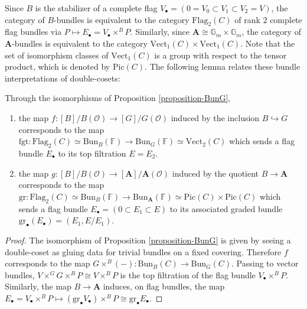 Since $B$ is the stabilizer of a complete flag $V_\bullet = (0=V_0\subset V_1\subset V_2=V)$, the category of $B$-bundles is equivalent to the category $\mathrm{Flag}_2(C)$ of rank $2$ complete flag bundles via $P\mapsto E_\bullet = V_\bullet \times^B P$. Similarly, since $\mathbf A\cong \mathbb G_m\times\mathbb G_m$, the category of $\mathbf A$-bundles is equivalent to the category $\mathrm{Vect}_1 (C)\times \mathrm{Vect}_1 (C)$. Note that the set of isomorphism classes of $\mathrm{Vect}_1 (C)$ is a group with respect to the tensor product, which is denoted by $\mathrm{Pic}(C)$. The following lemma relates these bundle interpretations of double-cosets:
\begin{lemma}
\label{lemma-flag-graded}
Through the isomorphisms of Proposition \ref{proposition-BunG},
\begin{enumerate}
\item the map $f: [B] /B(\mathcal O)\to [G]/G(\mathcal O)$ induced by the inclusion $B\hookrightarrow G$ corresponds to the map $\mathrm{fgt}: \mathrm{Flag}_2(C) \simeq\mathrm{Bun}_B(\mathbb F) \to \mathrm{Bun}_G(\mathbb F)\simeq \mathrm{Vect}_2(C)$ which sends a flag bundle $E_\bullet$ to its top filtration $E=E_2$.
\item the map $g: [B]/B(\mathcal O)\to [\mathbf A]/\mathbf A(\mathcal O)$ induced by the quotient $B\to \mathbf A$ corresponds to the map $\mathrm{gr}: \mathrm{Flag}_2(C)\simeq \mathrm{Bun}_B(\mathbb F)\to \mathrm{Bun}_{\mathbf A}(\mathbb F)\simeq \mathrm{Pic}(C)\times \mathrm{Pic}(C)$ which sends a flag bundle $E_\bullet = (0\subset E_1\subset E)$ to its associated graded bundle $\mathrm{gr}_\bullet(E_\bullet) = (E_1, E/E_1)$.
\end{enumerate}
\end{lemma}
\begin{proof}
The isomorphism of Proposition \ref{proposition-BunG} is given by seeing a double-coset as gluing data for trivial bundles on a fixed covering. Therefore $f$ corresponds to the map $G\times^B (-): \mathrm{Bun}_B(C)\to \mathrm{Bun}_G(C)$. Passing to vector bundles, $V\times^G G\times^B P\cong V\times^B P$ is the top filtration of the flag bundle $V_\bullet\times^B P$. 
Similarly, the map $B\to \mathbf A$ induces, on flag bundles, the map $E_\bullet = V_\bullet \times^B P\mapsto (\mathrm{gr}_\bullet V_\bullet) \times^B P \cong \mathrm{gr}_\bullet E_\bullet$. 
\end{proof}

